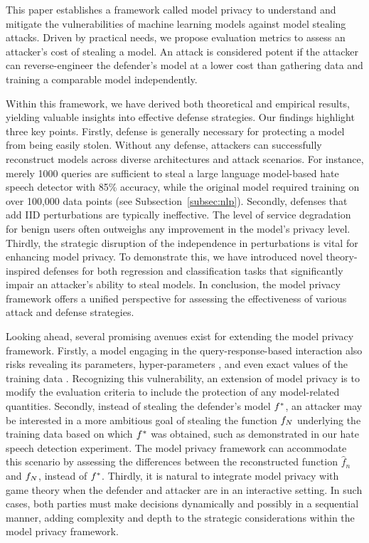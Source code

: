 This paper establishes a framework called model privacy to understand and mitigate the vulnerabilities of machine learning models against model stealing attacks. 
Driven by practical needs, we propose evaluation metrics to assess an attacker's cost of stealing a model. An attack is considered potent if the attacker can reverse-engineer the defender's model at a lower cost than gathering data and training a comparable model independently. 

Within this framework, we have derived both theoretical and empirical results, yielding valuable insights into effective defense strategies. Our findings highlight three key points. 
Firstly, defense is generally necessary for protecting a model from being easily stolen. Without any defense, attackers can successfully reconstruct models across diverse architectures and attack scenarios. For instance, merely 1000 queries are sufficient to steal a large language model-based hate speech detector with 85\% accuracy, while the original model required training on over 100,000 data points (see Subsection~\ref{subsec:nlp}). 
Secondly, defenses that add IID perturbations are typically ineffective. The level of service degradation for benign users often outweighs any improvement in the model's privacy level. Thirdly, the strategic disruption of the independence in perturbations is vital for enhancing model privacy. To demonstrate this, we have introduced novel theory-inspired defenses for both regression and classification tasks that significantly impair an attacker's ability to steal models. 
In conclusion, the model privacy framework offers a unified perspective for assessing the effectiveness of various attack and defense strategies.


Looking ahead, several promising avenues exist for extending the model privacy framework. 
Firstly, a model engaging in the query-response-based interaction also risks revealing its parameters, hyper-parameters \citep{tramer2016stealing, wang2018stealing}, and even exact values of the training data \citep{fredrikson2014privacy, fredrikson2015model}. Recognizing this vulnerability, an extension of model privacy is to modify the evaluation criteria to include the protection of any model-related quantities. %
Secondly, instead of stealing the defender's model $f^*$, an attacker may be interested in a more ambitious goal of stealing the function $f_{N}$ underlying the training data based on which $f^*$ was obtained, such as demonstrated in our hate speech detection experiment. The model privacy framework can accommodate this scenario by assessing the differences between the reconstructed function $\hat{f}_n$ and $f_{N}$, instead of $f^*$.
Thirdly, it is natural to integrate model privacy with game theory when the defender and attacker are in an interactive setting. In such cases, both parties must make decisions dynamically and possibly in a sequential manner, adding complexity and depth to the strategic considerations within the model privacy framework.


